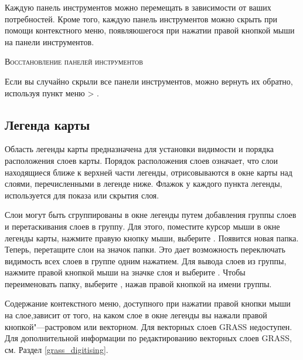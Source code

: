 Каждую панель инструментов можно перемещать в зависимости от ваших потребностей. Кроме того,
каждую панель инструментов можно скрыть при помощи контекстного меню, появляюшегося при нажатии
правой кнопкой мыши на панели инструментов.

\begin{Tip}
\caption{\textsc{Восстановление панелей инструментов}} 
Если вы случайно скрыли все панели инструментов, можно вернуть их обратно, используя пункт меню
  > .
\end{Tip}

\subsection{Легенда карты}\label{label_legend}

Область легенды карты предназначена для установки видимости и порядка расположения слоев карты.
Порядок расположения слоев означает, что слои находящиеся ближе к верхней части легенды,
отрисовываются в окне карты над слоями, перечисленными в легенде ниже. Флажок у каждого пункта
легенды, используется для показа или скрытия слоя.

Слои могут быть сгруппированы в окне легенды путем добавления группы слоев и перетаскивания слоев в
группу. Для этого, поместите курсор мыши в окне легенды карты, нажмите правую кнопку мыши, выберите
 . Появится новая папка. Теперь, перетащите слои на значок папки. Это
дает возможность переключать видимость всех слоев в группе одним нажатием. Для вывода слоев из
группы, нажмите правой кнопкой мыши на значке слоя и выберите . Чтобы переименовать папку, выберите , нажав правой кнопкой
на имени группы.

Содержание контекстного меню, доступного при нажатии правой кнопки мыши на слое,зависит от того,
на каком слое в окне легенды вы нажали правой кнопкой"---растровом или векторном. Для векторных
слоев GRASS  недоступен. Для дополнительной информации по
редактированию векторных слоев GRASS, см. Раздел \ref{grass_digitising}.

